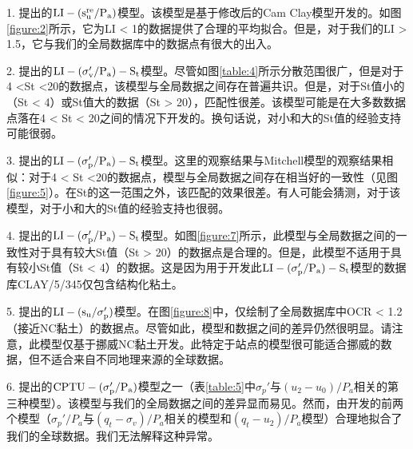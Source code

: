 \begin{Parallel}{0.60\textwidth}{}
{        1. \citet{Wroth1978137}提出的$\rm{LI}-(s_u^{re}/P_a)$模型。该模型是基于修改后的Cam Clay模型开发的。如图\ref{figure:2}所示，它为LI < 1的数据提供了合理的平均拟合。但是，对于我们的LI > 1.5，它与我们的全局数据库中的数据点有很大的出入。

        2. \citet{Mitchell1993}提出的$\rm{LI}-(\sigma_v'/P_a)-S_t$模型。尽管如图\ref{table:4}所示分散范围很广，但是对于4 <St <20的数据点，该模型与全局数据之间存在普遍共识。但是，对于St值小的（St < 4）或St值大的数据（St > 20），匹配性很差。该模型可能是在大多数数据点落在4 < St < 20之间的情况下开发的。换句话说，对小和大的St值的经验支持可能很弱。

        3. \citet{NAVFAC1982}提出的$\rm{LI}-(\sigma_p'/P_a)-S_t$模型。这里的观察结果与Mitchell模型的观察结果相似：对于4 < St <20的数据点，模型与全局数据之间存在相当好的一致性（见图\ref{figure:5}）。在St的这一范围之外，该匹配的效果很差。有人可能会猜测，对于该模型，对于小和大的St值的经验支持也很弱。

        4. \citet{Ching2012522}提出的$\rm{LI}-(\sigma_p'/P_a)-S_t$模型。如图\ref{figure:7}所示，此模型与全局数据之间的一致性对于具有较大St值（St > 20）的数据点是合理的。但是，此模型不适用于具有较小St值（St < 4）的数据。这是因为用于开发此$\rm{LI}-(\sigma_p'/P_a)-S_t$模型的数据库CLAY/5/345仅包含结构化粘土。
        
        5. \citet{Bjerrum1960711}提出的$\rm{LI}-(s_u/\sigma_p')$模型。在图\ref{figure:8}中，仅绘制了全局数据库中OCR < 1.2（接近NC黏土）的数据点。尽管如此，模型和数据之间的差异仍然很明显。请注意，此模型仅基于挪威NC黏土开发。此特定于站点的模型很可能适合挪威的数据，但不适合来自不同地理来源的全球数据。
        
        6. \citet{Chen1996488}提出的$\rm{CPTU}-(\sigma_p'/P_a)$模型之一（表\ref{table:5}中$\sigma_p'$与$(u_2-u_0)/P_a$相关的第三种模型）。该模型与我们的全局数据之间的差异显而易见。然而，由\citet{Chen1996488}开发的前两个模型（$\sigma_p'/P_a$与$(q_t-\sigma_v)/P_a$相关的模型和$(q_t-u_2)/P_a$模型）合理地拟合了我们的全球数据。我们无法解释这种异常。
    }
    \ParallelPar
    
\end{Parallel}